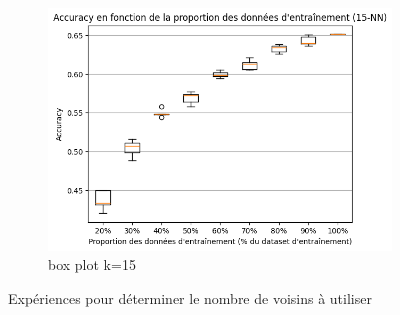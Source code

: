 \documentclass[12pt]{article}
\begin{document}
\begin{figure}[H]
\begin{subfigure}[t]{0.35\textwidth}
        \includegraphics[width=\textwidth]{static/knn_cam_15.png}
        \caption{box plot k=15}
    \end{subfigure}

    \caption{Expériences pour déterminer le nombre de voisins à utiliser}
\end{figure}
\end{document}
